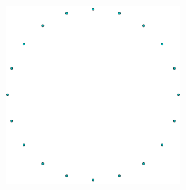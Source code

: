 \documentclass{beamer}
\begin{document}
\begin{frame}[fragile]
\begin{figure}[]
    \begin{center}
    \hspace{-0.5em}\includegraphics[width=0.6\textwidth]{static/complete.png}
    \end{center}
\end{figure}
\end{frame}
\end{document}
